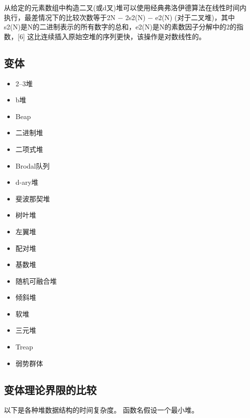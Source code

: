 从给定的元素数组中构造二叉(或d叉)堆可以使用经典弗洛伊德算法在线性时间内执行，最差情况下的比较次数等于2N − 2s2(N) − e2(N) (对于二叉堆)，其中 s2(N)是N的二进制表示的所有数字的总和，e2(N)是N的素数因子分解中的2的指数，[6] 这比连续插入原始空堆的序列更快，该操作是对数线性的。

\subsection{变体}
\begin{itemize}
\item 2–3堆
\item b堆
\item Beap
\item 二进制堆
\item 二项式堆
\item Brodal队列
\item d-ary堆
\item 斐波那契堆
\item 树叶堆
\item 左翼堆
\item 配对堆
\item 基数堆
\item 随机可融合堆
\item 倾斜堆
\item 软堆
\item 三元堆
\item Treap
\item 弱势群体
\end{itemize}

\subsection{变体理论界限的比较}
以下是各种堆数据结构的时间复杂度。 函数名假设一个最小堆。

